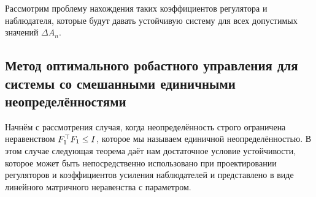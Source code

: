 Рассмотрим проблему нахождения таких коэффициентов регулятора и наблюдателя, которые будут давать устойчивую систему для всех допустимых значений $\Delta {A}_n$.

\subsection{Метод оптимального робастного управления для системы со смешанными единичными неопределённостями}\label{sec:ch4/sect2/sub1}

Начнём с рассмотрения случая, когда неопределённость строго ограничена неравенством ${F}_1^\top{F}_1\leq {I}$, которое мы называем единичной неопределённостью. В этом случае следующая теорема даёт нам достаточное условие устойчивости, которое может быть непосредственно использовано при проектировании регуляторов и коэффициентов усиления наблюдателей и представлено в виде линейного матричного неравенства с параметром.

